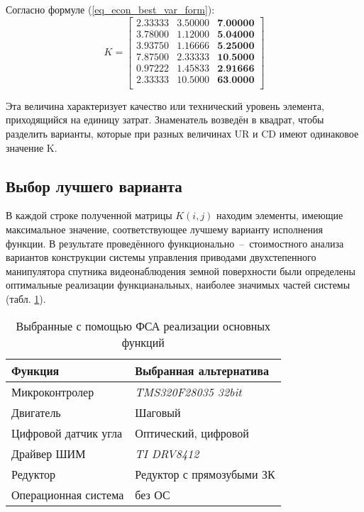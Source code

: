 Согласно формуле (\ref{eq_econ_best_var_form}):
\begin{equation}
    K =
        \begin{bmatrix}
            2.33333 & 3.50000 & \textbf{7.00000} \\
            3.78000 & 1.12000 & \textbf{5.04000} \\
            3.93750 & 1.16666 & \textbf{5.25000} \\
            7.87500 & 2.33333 & \textbf{10.5000} \\
            0.97222 & 1.45833 & \textbf{2.91666} \\
            2.33333 & 10.5000 & \textbf{63.0000} \\
        \end{bmatrix}
    \label{eq_econ_best_var}
\end{equation}

Эта величина характеризует качество или технический уровень
элемента, приходящийся на единицу затрат. Знаменатель возведён в квадрат,
чтобы разделить варианты, которые при разных величинах UR и CD имеют
одинаковое значение K.

\newpage
\subsection{Выбор лучшего варианта}
В каждой строке полученной матрицы $K(i, j)$ находим элементы,
имеющие максимальное значение, соответствующее лучшему варианту
исполнения функции.
В результате проведённого функционально~--~стоимостного анализа
вариантов конструкции системы управления приводами двухстепенного манипулятора
спутника видеонаблюдения земной поверхности были определены оптимальные
реализации функцианальных, наиболее значимых частей системы
(табл. \ref{tbl_econ_result}).

\begin{table}[ht]
    \centering
    \begin{tabular}{|l|l|}
        \hline
        Функция & Выбранная альтернатива \\
        \hline
        \hline
        Микроконтролер & \textit{TMS320F28035 32bit} \\
        \hline
        Двигатель & Шаговый \\
        \hline
        Цифровой датчик угла & Оптический, цифровой \\
        \hline
        Драйвер ШИМ & \textit{TI DRV8412} \\
        \hline
        Редуктор & Редуктор с прямозубыми ЗК \\
        \hline
        Операционная система & без ОС \\
        \hline
    \end{tabular}
    \caption{Выбранные с помощью ФСА реализации основных функций}
    \label{tbl_econ_result}
\end{table}

